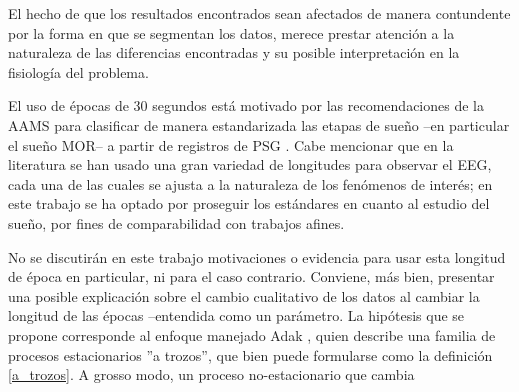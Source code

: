 El hecho de que los resultados encontrados sean afectados de manera contundente
por la forma en que se segmentan los
datos, merece prestar atenci\'on a la naturaleza de las diferencias encontradas y su 
posible interpretaci\'on en la fisiolog\'ia del problema.

El uso de \'epocas de 30 segundos est\'a motivado por las recomendaciones de la AAMS para 
clasificar de manera estandarizada las etapas de sue\~no --en particular el sue\~no MOR-- 
a partir de registros de PSG \cite{AASM07}. Cabe mencionar que 
en la literatura se han usado una gran variedad de
longitudes para observar el EEG, cada una de las cuales se ajusta a la naturaleza de los
fen\'omenos de inter\'es; en este trabajo se ha optado por proseguir los est\'andares en cuanto
al estudio del sue\~no, por fines de comparabilidad con trabajos afines.

No se discutir\'an en este trabajo motivaciones o evidencia para usar esta longitud de 
\'epoca en particular, ni para el caso contrario. Conviene, m\'as bien, presentar una posible
explicaci\'on sobre el cambio cualitativo de los datos al cambiar la longitud de las \'epocas
--entendida como un par\'ametro.
La hip\'otesis que se propone corresponde al enfoque manejado Adak \cite{Adak98}, 
quien describe una familia de procesos estacionarios ''a trozos'', que bien puede
formularse como la definici\'on \ref{a_trozos}. A grosso modo, un proceso no-estacionario
que cambia

\begin{defn}

\label{a_trozos}
\end{defn}

